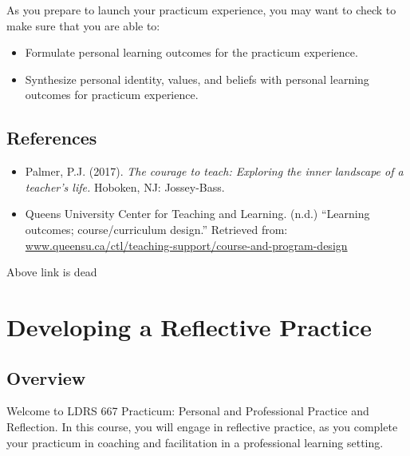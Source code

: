 \documentclass[
]{book}
\providecommand{\tightlist}{%
  \setlength{\itemsep}{0pt}\setlength{\parskip}{0pt}}
\begin{document}
\begin{progress}
As you prepare to launch your practicum experience, you may want to check to make sure that you are able to:

\begin{itemize}
\tightlist
\item
  Formulate personal learning outcomes for the practicum experience.\\
\item
  Synthesize personal identity, values, and beliefs with personal learning outcomes for practicum experience.
\end{itemize}
\end{progress}

\hypertarget{references}{%
\section*{References}\label{references}}

\begin{itemize}
\tightlist
\item
  Palmer, P.J. (2017). \emph{The courage to teach: Exploring the inner landscape of a teacher's life.} Hoboken, NJ: Jossey-Bass.\\
\item
  Queens University Center for Teaching and Learning. (n.d.) ``Learning outcomes; course/curriculum design.'' Retrieved from: \href{http://www.queensu.ca/ctl/teaching-support/course-and-program-design}{www.queensu.ca/ctl/teaching-support/course-and-program-design}
\end{itemize}

{Above link is dead}

\hypertarget{developing-a-reflective-practice}{%
\chapter{Developing a Reflective Practice}\label{developing-a-reflective-practice}}

\hypertarget{overview-1}{%
\section*{Overview}\label{overview-1}}

Welcome to LDRS 667 Practicum: Personal and Professional Practice and Reflection. In this course, you will engage in reflective practice, as you complete your practicum in coaching and facilitation in a professional learning setting.
\end{document}
